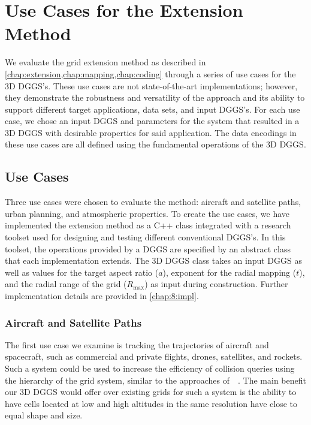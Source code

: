 \chapter{Use Cases for the Extension Method} \label{chap:usecases}
We evaluate the grid extension method as described in \cref{chap:extension,chap:mapping,chap:coding} through a series of use cases for the 3D DGGS's.
These use cases are not state-of-the-art implementations; however, they demonstrate the robustness and versatility of the approach and its ability to support different target applications, data sets, and input DGGS's.
For each use case, we chose an input DGGS and parameters for the system that resulted in a 3D DGGS with desirable properties for said application.
The data encodings in these use cases are all defined using the fundamental operations of the 3D DGGS.


\section{Use Cases}
Three use cases were chosen to evaluate the method: aircraft and satellite paths, urban planning, and atmospheric properties.
To create the use cases, we have implemented the extension method as a C++ class integrated with a research toolset used for designing and testing different conventional DGGS's.
In this toolset, the operations provided by a DGGS are specified by an abstract class that each implementation extends.
The 3D DGGS class takes an input DGGS as well as values for the target aspect ratio ($a$), exponent for the radial mapping ($t$), and the radial range of the grid ($R_\mathrm{max}$) as input during construction.
Further implementation details are provided in \cref{chap:8:impl}.


\subsection{Aircraft and Satellite Paths} \label{chap:8:sats}
The first use case we examine is tracking the trajectories of aircraft and spacecraft, such as commercial and private flights, drones, satellites, and rockets.
Such a system could be used to increase the efficiency of collision queries using the hierarchy of the grid system, similar to the approaches of~~\cite{miao2019low, zhai2019collision}.
The main benefit our 3D DGGS would offer over existing grids for such a system is the ability to have cells located at low and high altitudes in the same resolution have close to equal shape and size.


